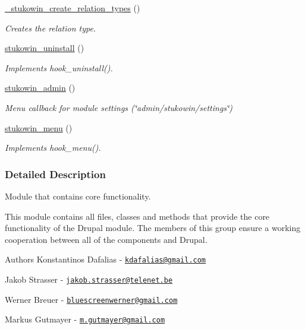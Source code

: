 \begin{DoxyCompactItemize}
\hyperlink{group___stukowin___module_gac59bc3fe951ab5625be92cfbff7e3dc4}{\+\_\+stukowin\+\_\+create\+\_\+relation\+\_\+types} ()
\begin{DoxyCompactList}\small\item\em Creates the relation type. \end{DoxyCompactList}\item 
\hyperlink{group___stukowin___module_gad831696eae7eb1a0e48c4e9621323bca}{stukowin\+\_\+uninstall} ()
\begin{DoxyCompactList}\small\item\em Implements hook\+\_\+uninstall(). \end{DoxyCompactList}\item 
\hyperlink{group___stukowin___module_ga55d453d5b6f8ae4e643308d8814e67a5}{stukowin\+\_\+admin} ()
\begin{DoxyCompactList}\small\item\em Menu callback for module settings (\char`\"{}admin/stukowin/settings\char`\"{}) \end{DoxyCompactList}\item 
\hyperlink{group___stukowin___module_ga59cfbad113b7aa2d10f0b204a5f7ba0d}{stukowin\+\_\+menu} ()
\begin{DoxyCompactList}\small\item\em Implements hook\+\_\+menu(). \end{DoxyCompactList}\end{DoxyCompactItemize}


\subsubsection{Detailed Description}
Module that contains core functionality. 

This module contains all files, classes and methods that provide the core functionality of the Drupal module. The members of this group ensure a working cooperation between all of the components and Drupal.

\begin{DoxyAuthor}{Authors}
Konstantinos Dafalias -\/ \href{mailto:kdafalias@gmail.com}{\tt kdafalias@gmail.\+com} 

Jakob Strasser -\/ \href{mailto:jakob.strasser@telenet.be}{\tt jakob.\+strasser@telenet.\+be} 

Werner Breuer -\/ \href{mailto:bluescreenwerner@gmail.com}{\tt bluescreenwerner@gmail.\+com} 

Markus Gutmayer -\/ \href{mailto:m.gutmayer@gmail.com}{\tt m.\+gutmayer@gmail.\+com} 
\end{DoxyAuthor}


